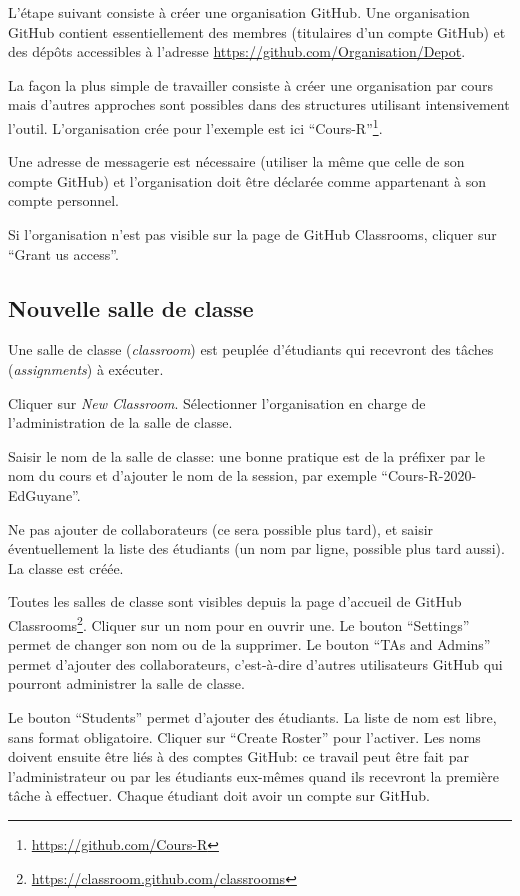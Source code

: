 \documentclass[
  12pt,
  french,
  a4paper,
  extrafontsizes,onecolumn,openright
  ]{memoir}
\begin{document}
L'étape suivant consiste à créer une organisation GitHub.
Une organisation GitHub contient essentiellement des membres (titulaires d'un compte GitHub) et des dépôts accessibles à l'adresse \url{https://github.com/Organisation/Depot}.

La façon la plus simple de travailler consiste à créer une organisation par cours mais d'autres approches sont possibles dans des structures utilisant intensivement l'outil.
L'organisation crée pour l'exemple est ici \enquote{Cours-R}\footnote{\url{https://github.com/Cours-R}}.

Une adresse de messagerie est nécessaire (utiliser la même que celle de son compte GitHub) et l'organisation doit être déclarée comme appartenant à son compte personnel.

Si l'organisation n'est pas visible sur la page de GitHub Classrooms, cliquer sur \enquote{Grant us access}.

\hypertarget{nouvelle-salle-de-classe}{%
\subsection{Nouvelle salle de classe}\label{nouvelle-salle-de-classe}}

Une salle de classe (\emph{classroom}) est peuplée d'étudiants qui recevront des tâches (\emph{assignments}) à exécuter.

Cliquer sur \emph{New Classroom}.
Sélectionner l'organisation en charge de l'administration de la salle de classe.

Saisir le nom de la salle de classe: une bonne pratique est de la préfixer par le nom du cours et d'ajouter le nom de la session, par exemple \enquote{Cours-R-2020-EdGuyane}.

Ne pas ajouter de collaborateurs (ce sera possible plus tard), et saisir éventuellement la liste des étudiants (un nom par ligne, possible plus tard aussi).
La classe est créée.

Toutes les salles de classe sont visibles depuis la page d'accueil de GitHub Classrooms\footnote{\url{https://classroom.github.com/classrooms}}.
Cliquer sur un nom pour en ouvrir une.
Le bouton \enquote{Settings} permet de changer son nom ou de la supprimer.
Le bouton \enquote{TAs and Admins} permet d'ajouter des collaborateurs, c'est-à-dire d'autres utilisateurs GitHub qui pourront administrer la salle de classe.

Le bouton \enquote{Students} permet d'ajouter des étudiants.
La liste de nom est libre, sans format obligatoire.
Cliquer sur \enquote{Create Roster} pour l'activer.
Les noms doivent ensuite être liés à des comptes GitHub: ce travail peut être fait par l'administrateur ou par les étudiants eux-mêmes quand ils recevront la première tâche à effectuer.
Chaque étudiant doit avoir un compte sur GitHub.
\end{document}
